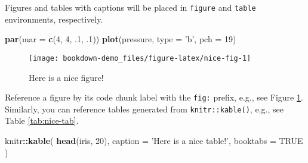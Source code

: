 \documentclass[]{book}
\newenvironment{Shaded}{\begin{snugshade}}{\end{snugshade}}
\newcommand{\DataTypeTok}[1]{\textcolor[rgb]{0.13,0.29,0.53}{#1}}
\newcommand{\DecValTok}[1]{\textcolor[rgb]{0.00,0.00,0.81}{#1}}
\newcommand{\FloatTok}[1]{\textcolor[rgb]{0.00,0.00,0.81}{#1}}
\newcommand{\KeywordTok}[1]{\textcolor[rgb]{0.13,0.29,0.53}{\textbf{#1}}}
\newcommand{\NormalTok}[1]{#1}
\newcommand{\OperatorTok}[1]{\textcolor[rgb]{0.81,0.36,0.00}{\textbf{#1}}}
\newcommand{\OtherTok}[1]{\textcolor[rgb]{0.56,0.35,0.01}{#1}}
\newcommand{\StringTok}[1]{\textcolor[rgb]{0.31,0.60,0.02}{#1}}
\begin{document}
Figures and tables with captions will be placed in \texttt{figure} and \texttt{table} environments, respectively.

\begin{Shaded}
\begin{Highlighting}[]
\KeywordTok{par}\NormalTok{(}\DataTypeTok{mar =} \KeywordTok{c}\NormalTok{(}\DecValTok{4}\NormalTok{, }\DecValTok{4}\NormalTok{, }\FloatTok{.1}\NormalTok{, }\FloatTok{.1}\NormalTok{))}
\KeywordTok{plot}\NormalTok{(pressure, }\DataTypeTok{type =} \StringTok{'b'}\NormalTok{, }\DataTypeTok{pch =} \DecValTok{19}\NormalTok{)}
\end{Highlighting}
\end{Shaded}

\begin{figure}

{\centering \texttt{[image: bookdown-demo\_files/figure-latex/nice-fig-1]} 

}

\caption{Here is a nice figure!}\label{fig:nice-fig}
\end{figure}

Reference a figure by its code chunk label with the \texttt{fig:} prefix, e.g., see Figure \ref{fig:nice-fig}. Similarly, you can reference tables generated from \texttt{knitr::kable()}, e.g., see Table \ref{tab:nice-tab}.

\begin{Shaded}
\begin{Highlighting}[]
\NormalTok{knitr}\OperatorTok{::}\KeywordTok{kable}\NormalTok{(}
  \KeywordTok{head}\NormalTok{(iris, }\DecValTok{20}\NormalTok{), }\DataTypeTok{caption =} \StringTok{'Here is a nice table!'}\NormalTok{,}
  \DataTypeTok{booktabs =} \OtherTok{TRUE}
\NormalTok{)}
\end{Highlighting}
\end{Shaded}
\end{document}
